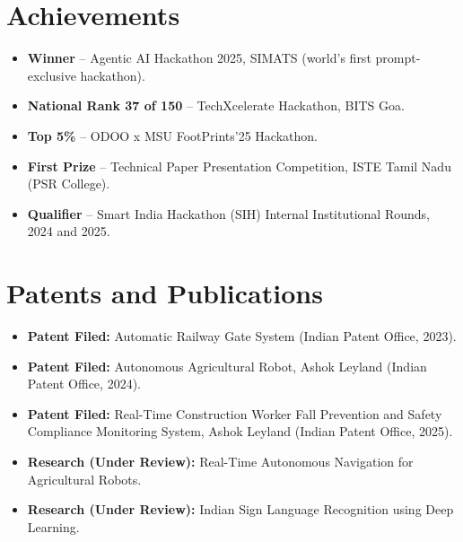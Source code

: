\documentclass[10pt,a4paper]{article}
\newcommand{\resumeItem}[1]{\item{\small #1}}
\begin{document}
\section*{Achievements}
\begin{itemize}
    \resumeItem{\textbf{Winner} -- Agentic AI Hackathon 2025, SIMATS (world's first prompt-exclusive hackathon).}
    \resumeItem{\textbf{National Rank 37 of 150} -- TechXcelerate Hackathon, BITS Goa.}
    \resumeItem{\textbf{Top 5\%} -- ODOO x MSU FootPrints'25 Hackathon.}
    \resumeItem{\textbf{First Prize} -- Technical Paper Presentation Competition, ISTE Tamil Nadu (PSR College).}
    \resumeItem{\textbf{Qualifier} -- Smart India Hackathon (SIH) Internal Institutional Rounds, 2024 and 2025.}
\end{itemize}

\section*{Patents and Publications}
\begin{itemize}
    \resumeItem{\textbf{Patent Filed:} Automatic Railway Gate System (Indian Patent Office, 2023).}
    \resumeItem{\textbf{Patent Filed:} Autonomous Agricultural Robot, Ashok Leyland (Indian Patent Office, 2024).}
    \resumeItem{\textbf{Patent Filed:} Real-Time Construction Worker Fall Prevention and Safety Compliance Monitoring System, Ashok Leyland (Indian Patent Office, 2025).}
    \resumeItem{\textbf{Research (Under Review):} Real-Time Autonomous Navigation for Agricultural Robots.}
    \resumeItem{\textbf{Research (Under Review):} Indian Sign Language Recognition using Deep Learning.}
\end{itemize}
\end{document}
